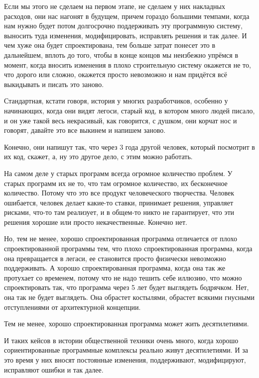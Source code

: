 Если мы этого не сделаем на первом этапе, не сделаем у них накладных расходов, они нас нагонят в будущем, причем гораздо большими темпами, когда нам нужно будет потом долгосрочно поддерживать эту программную систему, выносить туда изменения, модифицировать, исправлять решения и так далее. И чем хуже она будет спроектирована, тем больше затрат понесет это в дальнейшем, вплоть до того, чтобы в конце концов мы неизбежно упрёмся в момент, когда вносить изменения в плохо строительную систему окажется не то, что дорого или сложно, окажется просто невозможно и нам придётся всё выкидывать и писать это заново.

Стандартная, кстати говоря, история у многих разработчиков, особенно у начинающих, когда они видят легоси, старый код, в котором много людей писало, и он уже такой весь некрасивый, как говорится, с душком, они корчат нос и говорят, давайте это все выкинем и напишем заново.

 Конечно, они напишут так, что через 3 года другой человек, который посмотрит в их код, скажет, а, ну это другое дело, с этим можно работать.

На самом деле у старых программ всегда огромное количество проблем. У старых программ их не то, что там огромное количество, их бесконечное количество. Потому что это все продукт человеческого творчества. Человек ошибается, человек делает какие-то ставки, принимает решения, управляет рисками, что-то там реализует, и в общем-то никто не гарантирует, что эти решения хорошие или просто некачественные. Конечно нет.

Но, тем не менее, хорошо спроектированная программа отличается от плохо спроектированной программы тем, что плохо спроектированная программа, когда она превращается в легаси, ее становится просто физически невозможно поддерживать. А хорошо спроектированная программа, когда она так же протухает со временем, потому что не надо тешить себе иллюзию, что можно спроектировать так, что программа через 5 лет будет выглядеть бодрячком. Нет, она так не будет выглядеть. Она обрастет костылями, обрастет всякими гнусными отступлениями от архитектурной концепции.

Тем не менее, хорошо спроектированная программа может жить десятилетиями.

И таких кейсов в истории общественной техники очень много, когда хорошо сориентированные программные комплексы реально живут десятилетиями. И за это время у них вносят постоянные изменения, поддерживают, модифицируют, исправляют ошибки и так далее.


